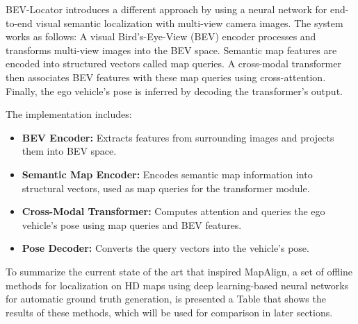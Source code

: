 BEV-Locator introduces a different approach by using a neural network for end-to-end visual semantic localization with multi-view camera images. The system works as follows: A visual Bird’s-Eye-View (BEV) encoder processes and transforms multi-view images into the BEV space. Semantic map features are encoded into structured vectors called map queries. A cross-modal transformer then associates BEV features with these map queries using cross-attention. Finally, the ego vehicle's pose is inferred by decoding the transformer's output. 

The implementation includes:
\begin{itemize}
    \item \textbf{BEV Encoder:} Extracts features from surrounding images and projects them into BEV space.
    \item \textbf{Semantic Map Encoder:} Encodes semantic map information into structural vectors, used as map queries for the transformer module.
    \item \textbf{Cross-Modal Transformer:} Computes attention and queries the ego vehicle's pose using map queries and BEV features.
    \item \textbf{Pose Decoder:} Converts the query vectors into the vehicle's pose.
\end{itemize}

To summarize the current state of the art that inspired MapAlign, a set of offline methods for localization on HD maps using deep learning-based neural networks for automatic ground truth generation, is presented a Table that shows the results of these methods, which will be used for comparison in later sections.

